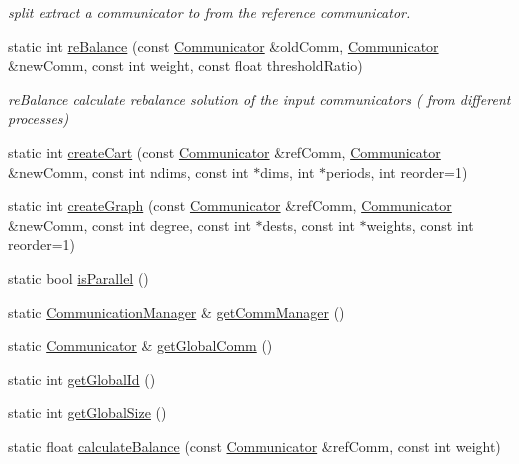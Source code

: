 \begin{DoxyCompactItemize}
\begin{DoxyCompactList}\small\item\em split extract a communicator to from the reference communicator. \item\end{DoxyCompactList}\item 
static int \hyperlink{classHSF_1_1COMM_aaaf021a10daa5fbfa85102953a0d8f1c}{reBalance} (const \hyperlink{classHSF_1_1Communicator}{Communicator} \&oldComm, \hyperlink{classHSF_1_1Communicator}{Communicator} \&newComm, const int weight, const float thresholdRatio)
\begin{DoxyCompactList}\small\item\em reBalance calculate rebalance solution of the input communicators ( from different processes) \item\end{DoxyCompactList}\item 
static int \hyperlink{classHSF_1_1COMM_afcbab02e03ac7f6bce379be298c427de}{createCart} (const \hyperlink{classHSF_1_1Communicator}{Communicator} \&refComm, \hyperlink{classHSF_1_1Communicator}{Communicator} \&newComm, const int ndims, const int $\ast$dims, int $\ast$periods, int reorder=1)
\item 
static int \hyperlink{classHSF_1_1COMM_ae7d2271832dcd8690685d8ccbee84615}{createGraph} (const \hyperlink{classHSF_1_1Communicator}{Communicator} \&refComm, \hyperlink{classHSF_1_1Communicator}{Communicator} \&newComm, const int degree, const int $\ast$dests, const int $\ast$weights, const int reorder=1)
\item 
static bool \hyperlink{classHSF_1_1COMM_ad97b577f23c1a1f9f72d8d84b497e2c2}{isParallel} ()
\item 
static \hyperlink{classHSF_1_1CommunicationManager}{CommunicationManager} \& \hyperlink{classHSF_1_1COMM_a73b9e5bcef8100fa37a940c2dd744c7b}{getCommManager} ()
\item 
static \hyperlink{classHSF_1_1Communicator}{Communicator} \& \hyperlink{classHSF_1_1COMM_adae610b00b4c4cd966a0d19cdf5fc0e8}{getGlobalComm} ()
\item 
static int \hyperlink{classHSF_1_1COMM_a4c2a5c578e26fb2e53f8fad13f9e79ba}{getGlobalId} ()
\item 
static int \hyperlink{classHSF_1_1COMM_a454b84b21cd889f986a94fe0d51d43ee}{getGlobalSize} ()
\item 
static float \hyperlink{classHSF_1_1COMM_aab59c2848eee97f010d9b50c3d3881b4}{calculateBalance} (const \hyperlink{classHSF_1_1Communicator}{Communicator} \&refComm, const int weight)

\end{DoxyCompactItemize}
